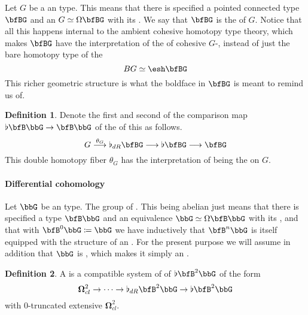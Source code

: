 \documentclass[12pt,titlepage]{article}
\theoremstyle{plain}
\theoremstyle{definition}
\newtheorem{defn}{Definition}
\theoremstyle{remark}
\begin{document}
Let $G$ be a an  type. This means that there is specified a pointed connected type $\bfBG$ and an  $G\simeq \Omega \bfBG$ with its . We say that $\bfBG$ is the  of $G$. Notice that all this happens internal to the ambient cohesive homotopy type theory, which makes $\bfBG$ have the interpretation of the  of cohesive $G$-, instead of just the bare homotopy type of the 
\begin{displaymath}
B G \simeq \esh  \bfBG
\end{displaymath}
This richer geometric structure is what the boldface in $\bfBG$ is meant to remind us of.
\begin{defn}
\label{}\hypertarget{}{}
Denote the first and second  of the comparison map $\flat \bfB\bbG \to \bfB\bbG$ of the  of this as follows.
\begin{displaymath}
G
\stackrel{\theta_G}{\longrightarrow}
\flat_{dR}\bfBG
\longrightarrow
\flat \bfBG
\longrightarrow
\bfBG
\end{displaymath}
This double homotopy fiber $\theta_G$ has the interpretation of being the  on $G$.
\end{defn}
\hypertarget{differential_cohomology}{}\paragraph*{{Differential cohomology}}\label{differential_cohomology}
Let $\bbG$ be an  type. The group of .
This being abelian just means that there is specified a  type $\bfB \bbG$ and an equivalence $\bbG\simeq \Omega \bfB \bbG$ with its , and that with $\bfB^0 \bbG \coloneqq \bbG$ we have inductively that $\bfB^n \bbG$ is itself equipped with the structure of an .
For the present purpose we will assume in addition that $\bbG$ is , which makes it simply an .
\begin{defn}
\label{}\hypertarget{}{}
A  is a compatible system of  of $\flat \bfB^2\bbG$ of the form
\begin{displaymath}
\mathbf{\Omega}^{2}_{cl}
\to
\cdots
\to
\flat_{dR} \bfB^2 \bbG
\to
\flat \bfB^2 \bbG
\end{displaymath}
with 0-truncated extensive $\mathbf{\Omega}^{2}_{cl}$.
\end{defn}
\end{document}
